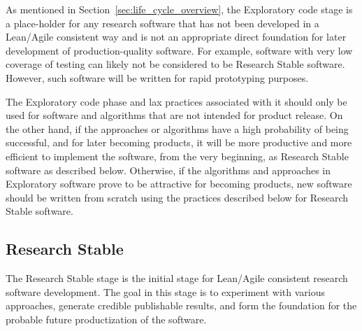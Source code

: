 \documentclass[11pt]{SANDreport}
\begin{document}
As mentioned in Section~\ref{sec:life_cycle_overview}, the Exploratory code stage is a place-holder for any research software that has not been developed in a Lean/Agile consistent way and is not an appropriate direct foundation for later development of production-quality software.  For example, software with very low coverage of testing can likely not be considered to be Research Stable software.  However, such software will be written for rapid prototyping purposes.

The Exploratory code phase and lax practices associated with it should only be used for software and algorithms that are not intended for product release.  On the other hand, if the approaches or algorithms have a high probability of being successful, and for later becoming products, it will be more productive and more efficient to implement the software, from the very beginning, as Research Stable software as described below.  Otherwise, if the algorithms and approaches in Exploratory software prove to be attractive for becoming products, new software should be written from scratch using the practices described below for Research Stable software.


%
{}\subsection{Research Stable}
\label{sec:research_stable_code}
%

The Research Stable stage is the initial stage for Lean/Agile consistent research software development.  The goal in this stage is to experiment with various approaches, generate credible publishable results, and form the foundation for the probable future productization of the software.
\end{document}
